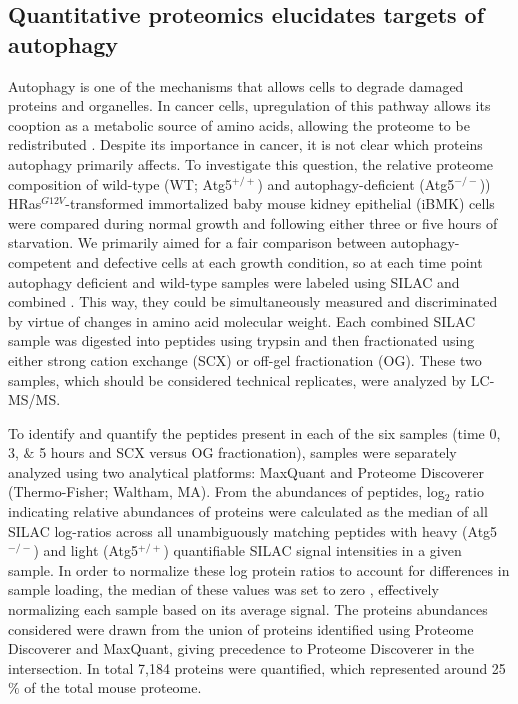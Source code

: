 \subsection{Quantitative proteomics elucidates targets of autophagy}
  
 Autophagy is one of the mechanisms that allows cells to degrade damaged proteins and organelles.  In cancer cells, upregulation of this pathway allows its cooption as a metabolic source of amino acids, allowing the proteome to be redistributed \cite{Rabinowitz:2010fx}.  Despite its importance in cancer, it is not clear which proteins autophagy primarily affects.  To investigate this question, the relative proteome composition of wild-type (WT; Atg5$^{+/+}$) and  autophagy-deficient (Atg5$^{-/-}$)) HRas$^{G12V}$-transformed immortalized baby mouse kidney epithelial (iBMK) cells \cite{Guo:2011ba} were compared during normal growth and following either three or five hours of starvation.  We primarily aimed for a fair comparison between autophagy-competent and defective cells at each growth condition, so at each time point autophagy deficient and wild-type samples were labeled using SILAC and combined \cite{Ong:2002tf}. This way, they could be simultaneously measured and discriminated by virtue of changes in amino acid molecular weight.  Each combined SILAC sample was digested into peptides using trypsin and then fractionated using either strong cation exchange (SCX) or off-gel fractionation (OG).  These two samples, which should be considered technical replicates, were analyzed by LC-MS/MS.  
 
To identify and quantify the peptides present in each of the six samples (time 0, 3, $\&$ 5 hours and SCX versus OG fractionation), samples were separately analyzed using two analytical platforms: MaxQuant \cite{Cox:2008ir} and Proteome Discoverer (Thermo-Fisher; Waltham, MA). From the abundances of peptides, log$_{2}$ ratio indicating relative abundances of proteins were calculated as the median of all SILAC log-ratios across all unambiguously matching peptides with heavy (Atg5$^{-/-}$) and light (Atg5$^{+/+}$) quantifiable SILAC signal intensities in a given sample. In order to normalize these log protein ratios to account for differences in sample loading, the median of these values was set to zero \cite{Cox:2008ir}, effectively normalizing each sample based on its average signal. The proteins abundances considered were drawn from the union of proteins identified using Proteome Discoverer and MaxQuant, giving precedence to Proteome Discoverer in the intersection. In total 7,184 proteins were quantified, which represented around 25$\%$ of the total mouse proteome.
 
